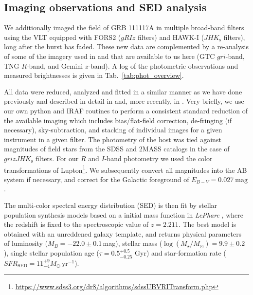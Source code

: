 \documentclass{aa}    %
\begin{document}


\subsection{Imaging observations and SED analysis} \label{SED}

We additionally imaged the field of GRB 111117A in multiple broad-band filters using the VLT equipped with FORS2 ($gRIz$ filters) and HAWK-I ($JHK_{\mathrm{s}}$ filters), long after the burst has faded. These new data are complemented by a re-analysis of some of the imagery used in \citet{Margutti2012} and \citet{Sakamoto2013} that are available to us here (GTC $gri$-band, TNG $R$-band, and Gemini $z$-band). A log of the photometric observations and measured brightnesses is given in Tab.~\ref{tab:phot_overview}.

All data were reduced, analyzed and fitted in a similar manner as we have done previously and described in detail in \citet{Kruhler2011a} and, more recently, in \citet{Schulze2016}. Very briefly, we use our own python and IRAF routines to perform a consistent standard reduction of the available imaging which includes bias/flat-field correction, de-fringing (if necessary), sky-subtraction, and stacking of individual images for a given instrument in a given filter. The photometry of the host was tied against magnitudes of field stars from the SDSS and 2MASS catalogs in the case of $grizJHK_{\mathrm{s}}$ filters. For our $R$ and $I$-band photometry we used the color transformations of Lupton\footnote{\url{https://www.sdss3.org/dr8/algorithms/sdssUBVRITransform.php}}. We subsequently convert all magnitudes into the AB system if necessary, and correct for the Galactic foreground of $E_{B-V}=0.027~\mathrm{mag}$.

The multi-color spectral energy distribution (SED) is then fit by \citet{Bruzual2003} stellar population synthesis models based on a \citet{Chabrier2003} initial mass function in \emph{LePhare} \citep{Ilbert2006}, where the redshift is fixed to the spectroscopic value of $z=2.211$. The best model is obtained with an unreddened galaxy template, and returns physical parameters of luminosity ($M_B=-22.0\pm0.1$\,mag), stellar mass ($\log(M_{\star}/M_\odot) = 9.9\pm0.2$), single stellar population age ($\tau = 0.5_{-0.25}^{+0.5}$ Gyr) and star-formation rate ($SFR_{\mathrm{SED}}=11_{-4}^{+9} M_\odot\,\mathrm{yr}^{-1}$). %
\end{document}
